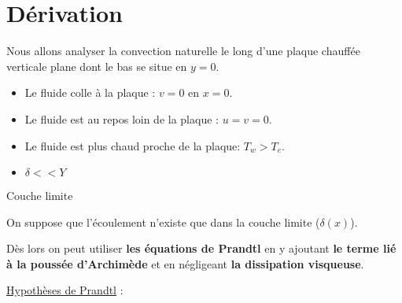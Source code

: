 \section{Dérivation}

\noindent Nous allons analyser la convection naturelle le long d'une plaque chauffée verticale plane dont le bas se situe en $y=0$.

\begin{itemize}
  \item Le fluide colle à la plaque : $v = 0$ en $x = 0$.
  \item Le fluide est au repos loin de la plaque : $u = v = 0$.
  \item Le fluide est plus chaud proche de la plaque: $T_w > T_e$.
  \item $\delta << Y$
\end{itemize}

\begin{marginfigure}
  \caption{Couche limite}
  \label{fig:couche-limite}
\end{marginfigure}

\noindent On suppose que l'écoulement n'existe que dans la couche limite ($\delta(x)$).


\noindent Dès lors on peut utiliser \textbf{les équations de Prandtl} en y ajoutant \textbf{le terme lié à la poussée d'Archimède} et en négligeant \textbf{la dissipation visqueuse}.


\noindent \underline{Hypothèses de Prandtl} :


